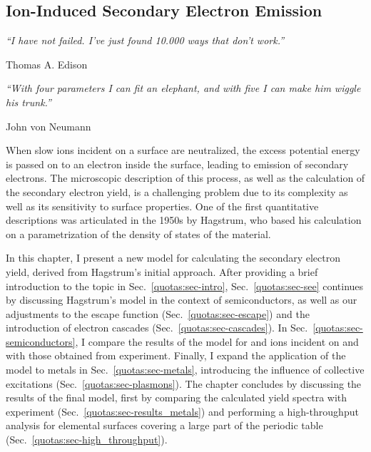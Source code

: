 \begin{refsection} 
 
\chapter{Ion-Induced Secondary Electron Emission} \label{chapter:quotas} 
 
\setlength{\epigraphwidth}{4in} 
\epigraph{\textit{``I have not failed. I've just found 10.000 ways that don't 
work.''}}{Thomas A. Edison} 
 
\setlength{\epigraphwidth}{4in} 
\epigraph{\textit{``With four parameters I can fit an elephant, and with five 
I can make him wiggle his trunk.''}}{John von Neumann} 
 
\vspace{2em} 
 
When slow ions incident on a surface are neutralized, the excess potential 
energy is passed on to an electron inside the surface, leading to emission of 
secondary electrons. The microscopic description of this process, as well as 
the calculation of the secondary electron yield, is a challenging problem due 
to its complexity as well as its sensitivity to surface properties. One of the 
first quantitative descriptions was articulated in the 1950s by Hagstrum, who 
based his calculation on a parametrization of the density of states of the 
material.  
 
In this chapter, I present a new model for calculating the secondary electron 
yield, derived from Hagstrum's initial approach. After providing a brief 
introduction to the topic in Sec.~\ref{quotas:sec-intro}, 
Sec.~\ref{quotas:sec-see} continues by discussing Hagstrum's model in the 
context of semiconductors, as well as our adjustments to the escape function 
(Sec.~\ref{quotas:sec-escape}) and the introduction of electron cascades 
(Sec.~\ref{quotas:sec-cascades}). In Sec.~\ref{quotas:sec-semiconductors}, I 
compare the results of the model for  and  ions incident on 
 and  with those obtained from experiment. Finally, I 
expand the application of the model to metals in Sec.~\ref{quotas:sec-metals}, 
introducing the influence of collective excitations 
(Sec.~\ref{quotas:sec-plasmons}). The chapter concludes by discussing the 
results of the final model, first by comparing the calculated yield spectra 
with experiment (Sec.~\ref{quotas:sec-results_metals}) and performing a 
high-throughput analysis for elemental surfaces covering a large part of the 
periodic table (Sec.~\ref{quotas:sec-high_throughput}).


\end{refsection}
